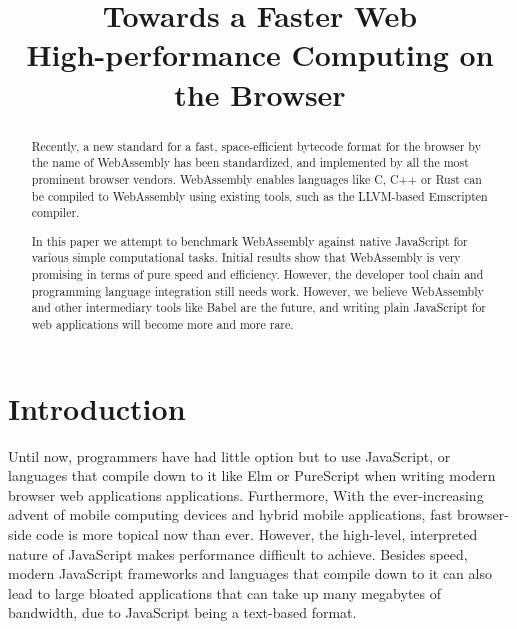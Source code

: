 \documentclass[conference]{IEEEtran}
\begin{document}
\title{Towards a Faster Web\\High-performance Computing on the Browser}

\author{
\and
{}
\and
{}
}
\maketitle

\begin{abstract}
Recently, a new standard for a fast, space-efficient bytecode format for the
  browser by the name of WebAssembly has been standardized,  and implemented by
  all the most prominent browser vendors. WebAssembly enables languages like C,
  C++ or Rust can be compiled to WebAssembly using existing tools, such as the LLVM-based Emscripten compiler.

  In this paper we attempt to benchmark WebAssembly against native JavaScript
  for various simple computational tasks. Initial results show that WebAssembly
  is very promising in terms of pure speed and efficiency. However, the
  developer tool chain and programming language integration still needs work.
  However, we believe WebAssembly and other intermediary tools like Babel are
  the future, and writing plain JavaScript for web applications will become
  more and more rare.
\end{abstract}

\section{Introduction}
Until now, programmers have had little option but to use JavaScript, or
languages that compile down to it like Elm or PureScript when writing modern
browser web applications applications. Furthermore, With the ever-increasing
advent of mobile computing devices and hybrid mobile applications, fast
browser-side code is more topical now than ever. However, the high-level,
interpreted nature of JavaScript makes performance difficult to achieve.
Besides speed, modern JavaScript frameworks and languages that compile down to
it can also lead to large bloated applications that can take up many megabytes
of bandwidth, due to JavaScript being a text-based format.
\end{document}
